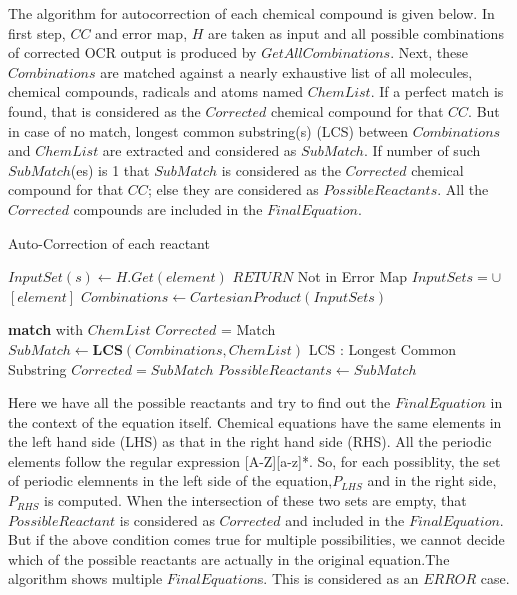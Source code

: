 \documentclass[conference]{IEEEtran}
\begin{document}
The algorithm for autocorrection of each chemical compound is given below.
In first step, $CC$ and error map, $H$  are taken as input and all possible combinations of corrected OCR output is produced by $GetAllCombinations$. Next, these $Combinations$ are matched against a nearly exhaustive list of all molecules, chemical compounds, radicals and atoms named $ChemList$. If a perfect match is found, that is considered as the $Corrected$ chemical compound for that $CC$. But in case of no match, longest common substring(s) (LCS) between $Combinations$ and $ChemList$ are extracted and considered as $SubMatch$. If number of such $SubMatch$(es) is 1 that $SubMatch$ is considered as the $Corrected$ chemical compound for that $CC$; else they are considered as $PossibleReactants$. All the $Corrected$ compounds are included in the $FinalEquation$.
\begin{algorithm}
\caption{Auto-Correction of each reactant}
\begin{algorithmic}[1]
		\State $InputSet(s) \leftarrow H.Get(element)$ 
			\State $RETURN$ \Comment Not in Error Map
		\Else
				\State $InputSets =\cup$ $[element]$ 
			\EndIf
		\EndIf
	\EndFor
\State $Combinations \leftarrow CartesianProduct(InputSets)$ %
\EndProcedure
\Statex

		\State \textbf{match} {with $ChemList$}
	\EndFor
		\State $Corrected$ = Match
	\Else
		\State $SubMatch \leftarrow \textbf{LCS}(Combinations,ChemList)$ 
		\Statex \Comment LCS : Longest Common Substring
			\State $Corrected = SubMatch$
		\Else
			\State $PossibleReactants \leftarrow SubMatch$
		\EndIf
	\EndIf

\EndProcedure
\end{algorithmic}
\end{algorithm}

Here we have all the possible reactants and try to find out the $FinalEquation$ in the context of the equation itself. Chemical equations have the same elements in the left hand side (LHS) as that in the right hand side (RHS). All the periodic elements follow the regular expression [A-Z][a-z]*. So, for each possiblity, the set of periodic elemnents in the left side of the equation,$P_{LHS}$ and in the right side, $P_{RHS}$ is computed. When the intersection of these two sets are empty, that $PossibleReactant$ is considered as $Corrected$ and included in the $FinalEquation$. But if the above condition comes true for multiple possibilities, we cannot decide which of the possible reactants are actually in the original equation.The algorithm shows multiple $FinalEquation$s. This is considered as an $ERROR$ case.\\
\end{document}
